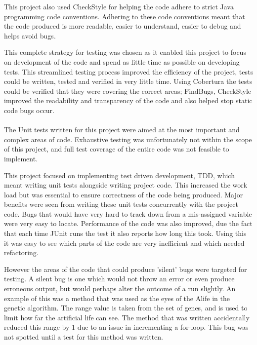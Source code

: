 \documentclass[12pt]{article}
\begin{document}
This project also used
CheckStyle for helping the code adhere to strict Java programming code conventions. Adhering to these code conventions meant that
the code produced is more readable, easier to understand, easier to debug and helps avoid bugs.

This complete strategy for testing was chosen as it enabled this project to focus on development of the code and spend as little
time as possible on developing tests. This streamlined testing process improved the efficiency of the project, tests could 
be written, tested and verified in very little time. Using Cobertura the tests could be verified that they were covering the
correct areas; FindBugs, CheckStyle improved the readability and transparency of the code and also helped stop static code
bugs occur.


\paragraph{}

The Unit tests written for this project were aimed at the most important and complex areas of code. Exhaustive testing was 
unfortunately not within the scope of this project, and full test coverage of the entire code was not feasible to implement.

This project focused on implementing test driven development, TDD, which meant writing unit tests alongside writing project code.
This increased the work load but was essential to ensure correctness of the code being produced. Major benefits were seen from
writing these unit tests concurrently with the project code. Bugs that would have very hard to track down from a mis-assigned
variable were very easy to locate. Performance of the code was also improved, due the fact that each time JUnit runs the test
it also reports how long this took. Using this it was easy to see which parts of the code are very inefficient and which needed
refactoring. 

However the 
areas of the code that could produce 'silent' bugs were targeted for testing. A silent bug is one which would not throw an error
or even produce erroneous output, but would perhaps alter the outcome of a run slightly. An example of this was a method that
was used as the eyes of the Alife in the genetic algorithm. The range value is taken from the set of genes, and is used 
to limit how far the artificial life can see. The method that was written accidentally reduced this range by 1 due to an issue
in incrementing a for-loop. This bug was not spotted until a test for this method was written. 
\end{document}
